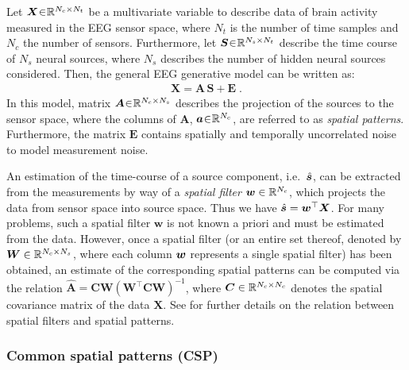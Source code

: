 \documentclass[10pt,a4paper, twocolumn]{article}
\providecommand{\mat}[1]{{\bm {#1}}}
\begin{document}
Let $\mat{X}\negmedspace\in\negmedspace \Real^{N_c \times N_t}$ be a multivariate variable to describe data of brain activity measured in the EEG sensor space, where $N_t$ is the number of time samples and $N_c$ the number of sensors. Furthermore, let $\mat{S} \negmedspace\in\negmedspace \Real^{N_s \times N_t}$ describe the time course of $N_s$ neural sources, where $N_s$ describes the number of hidden neural sources considered. Then, the general EEG generative model can be written as: 
\begin{align}\label{eq:genModel}
\mat{X}=\mat{A}\,\mat{S} + \mat{E} \;.
\end{align} 
In this model, matrix $\mat{A}\negmedspace\in\negmedspace \Real^{N_c \times N_s}$ describes the projection of the sources to the sensor space, where the columns of $\mat{A}$, ${\bm {a}} \negmedspace\in\negmedspace \mathbb{R}^{N_c}$, are referred to as \emph{spatial patterns}. Furthermore, the matrix $\mat{E}$ contains spatially and temporally uncorrelated noise to model measurement noise. 

An estimation of the time-course of a source component, i.e.\ $\hat{{\bm {s}}}$, can be extracted from the measurements by way of a \emph{spatial filter} ${\bm {w}} \in \mathbb{R}^{N_c}$, which projects the data from sensor space into source space. Thus we have $\hat{\ve{s}} = \ve{w}^\top\mat{X}$.
For many problems, such a spatial filter $\mat{w}$ is not known a priori and must be estimated from the data. However, once a spatial filter (or an entire set thereof, denoted by $\mat{W} \in \Real^{N_c \times N_s}$, where each column ${\bm {w}}$ represents a single spatial filter) has been obtained, an estimate of the corresponding spatial patterns can be computed via the relation $ \hat{\mat{A}} = \mat{C} \mat{W} \left( \mat{W}^\top \mat{C} \mat{W} \right)^{-1} $, where $\mat{C} \in  \Real^{N_c \times N_c} $ denotes the spatial covariance matrix of the data $\mat{X}$. See \cite{haufe2014interpretation} for further details on the relation between spatial filters and spatial patterns.  

\subsubsection{Common spatial patterns (CSP)}
\end{document}
